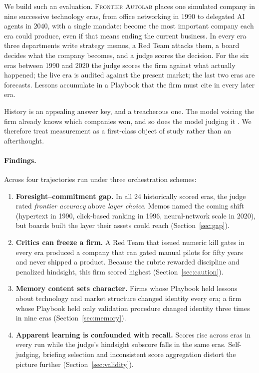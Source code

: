 \documentclass[11pt]{article}
\theoremstyle{definition}
\newcommand{\sys}{\textsc{Frontier Autolab}}
\begin{document}
We build such an evaluation. \sys{} places one simulated company in nine successive technology eras, from office networking in 1990 to delegated AI agents in 2040, with a single mandate: become the most important company each era could produce, even if that means ending the current business. In every era three departments write strategy memos, a Red Team attacks them, a board decides what the company becomes, and a judge scores the decision. For the six eras between 1990 and 2020 the judge scores the firm against what actually happened; the live era is audited against the present market; the last two eras are forecasts. Lessons accumulate in a Playbook that the firm must cite in every later era.

History is an appealing answer key, and a treacherous one. The model voicing the firm already knows which companies won, and so does the model judging it \citep{sainz2023trouble,golchin2024timetravel,cheng2024dated,glasserman2023lookahead,paleka2026pitfalls}. We therefore treat measurement as a first-class object of study rather than an afterthought.

\paragraph{Findings.} Across four trajectories run under three orchestration schemes:

\begin{enumerate}
  \item \textbf{Foresight--commitment gap.} In all 24 historically scored eras, the judge rated \emph{frontier accuracy} above \emph{layer choice}. Memos named the coming shift (hypertext in 1990, click-based ranking in 1996, neural-network scale in 2020), but boards built the layer their assets could reach (Section~\ref{sec:gap}).
  \item \textbf{Critics can freeze a firm.} A Red Team that issued numeric kill gates in every era produced a company that ran gated manual pilots for fifty years and never shipped a product. Because the rubric rewarded discipline and penalized hindsight, this firm scored highest (Section~\ref{sec:caution}).
  \item \textbf{Memory content sets character.} Firms whose Playbook held lessons about technology and market structure changed identity every era; a firm whose Playbook held only validation procedure changed identity three times in nine eras (Section~\ref{sec:memory}).
  \item \textbf{Apparent learning is confounded with recall.} Scores rise across eras in every run while the judge's hindsight subscore falls in the same eras. Self-judging, briefing selection and inconsistent score aggregation distort the picture further (Section~\ref{sec:validity}).
\end{enumerate}
\end{document}
